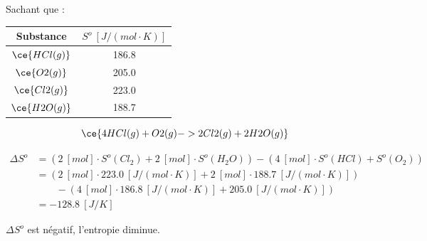 \documentclass[
  11pt,
  a4paper,
  openany]{book}
\begin{document}
Sachant que :

\begin{longtable}[]{@{}cc@{}}
\toprule\noalign{}
Substance & \(S^o\ [J/(mol \cdot K)]\) \\
\midrule\noalign{}
\endhead
\bottomrule\noalign{}
\endlastfoot
\(\ce{HCl(g)}\) & 186.8 \\
\(\ce{O2(g)}\) & 205.0 \\
\(\ce{Cl2(g)}\) & 223.0 \\
\(\ce{H2O(g)}\) & 188.7 \\
\end{longtable}


\begin{Answer}

\[ \ce{4 HCl(g) + O2(g) -> 2 Cl2(g) + 2 H2O(g)} \]

\[
\begin{split}
\Delta S^o &= (2\ [mol] \cdot S^o(Cl_2) + 2\ [mol] \cdot S^o(H_2O) ) - ( 4\ [mol] \cdot S^o(HCl) + S^o(O_2) ) \\
&= (2\ [mol] \cdot 223.0\ [J/(mol \cdot K)] + 2\ [mol] \cdot 188.7\ [J/(mol \cdot K)] ) \\
& \qquad - ( 4\ [mol] \cdot 186.8\ [J/(mol \cdot K)] + 205.0\ [J/(mol \cdot K)] ) \\
&= -128.8\ [J/K]
\end{split}
\]

\(\Delta S^o\) est négatif, l'entropie diminue.

\clearpage

\end{Answer}

\clearpage
\end{document}
